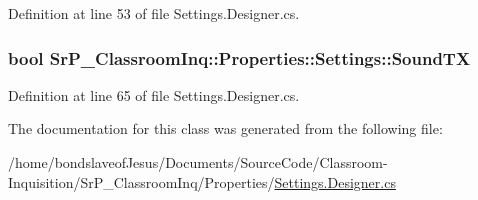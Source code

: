 \-Definition at line 53 of file \-Settings.\-Designer.\-cs.

\hypertarget{class_sr_p___classroom_inq_1_1_properties_1_1_settings_a0baa5402bcfc0c013d2c43fd95adc7e2}{
\subsubsection[{\-Sound\-T\-X}]{\setlength{\rightskip}{0pt plus 5cm}bool \-Sr\-P\-\_\-\-Classroom\-Inq\-::\-Properties\-::\-Settings\-::\-Sound\-T\-X}}
\label{class_sr_p___classroom_inq_1_1_properties_1_1_settings_a0baa5402bcfc0c013d2c43fd95adc7e2}


\-Definition at line 65 of file \-Settings.\-Designer.\-cs.



\-The documentation for this class was generated from the following file\-:\begin{DoxyCompactItemize}
\item 
/home/bondslaveof\-Jesus/\-Documents/\-Source\-Code/\-Classroom-\/\-Inquisition/\-Sr\-P\-\_\-\-Classroom\-Inq/\-Properties/\hyperlink{_settings_8_designer_8cs}{\-Settings.\-Designer.\-cs}\end{DoxyCompactItemize}
